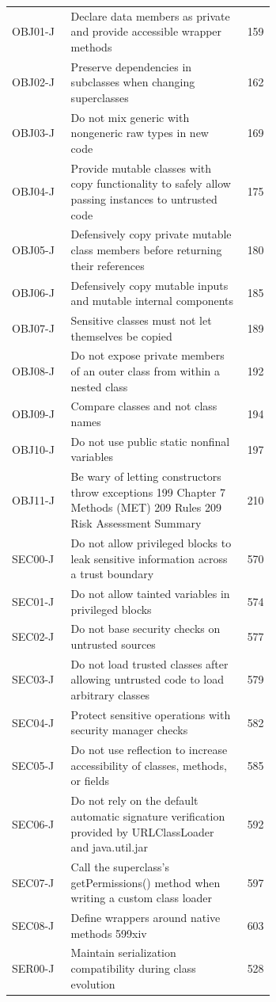 \documentclass[11pt]{report}
\begin{document}
\begin{longtable}{@{}l>{\raggedright\arraybackslash}p{0.66\linewidth}r@{}}
OBJ01-J & Declare data members as private and provide accessible wrapper methods & 159\\
OBJ02-J & Preserve dependencies in subclasses when changing superclasses & 162\\
OBJ03-J & Do not mix generic with nongeneric raw types in new code & 169\\
OBJ04-J & Provide mutable classes with copy functionality to safely allow passing instances to untrusted code & 175\\
OBJ05-J & Defensively copy private mutable class members before returning their references & 180\\
OBJ06-J & Defensively copy mutable inputs and mutable internal components & 185\\
OBJ07-J & Sensitive classes must not let themselves be copied & 189\\
OBJ08-J & Do not expose private members of an outer class from within a nested class & 192\\
OBJ09-J & Compare classes and not class names & 194\\
OBJ10-J & Do not use public static nonfinal variables & 197\\
OBJ11-J & Be wary of letting constructors throw exceptions 199 Chapter 7 Methods (MET) 209 Rules 209 Risk Assessment Summary & 210\\
SEC00-J & Do not allow privileged blocks to leak sensitive information across a trust boundary & 570\\
SEC01-J & Do not allow tainted variables in privileged blocks & 574\\
SEC02-J & Do not base security checks on untrusted sources & 577\\
SEC03-J & Do not load trusted classes after allowing untrusted code to load arbitrary classes & 579\\
SEC04-J & Protect sensitive operations with security manager checks & 582\\
SEC05-J & Do not use reflection to increase accessibility of classes, methods, or fields & 585\\
SEC06-J & Do not rely on the default automatic signature verification provided by URLClassLoader and java.util.jar & 592\\
SEC07-J & Call the superclass’s getPermissions() method when writing a custom class loader & 597\\
SEC08-J & Define wrappers around native methods 599xiv & 603\\
SER00-J & Maintain serialization compatibility during class evolution & 528\\

\end{longtable}
\end{document}
